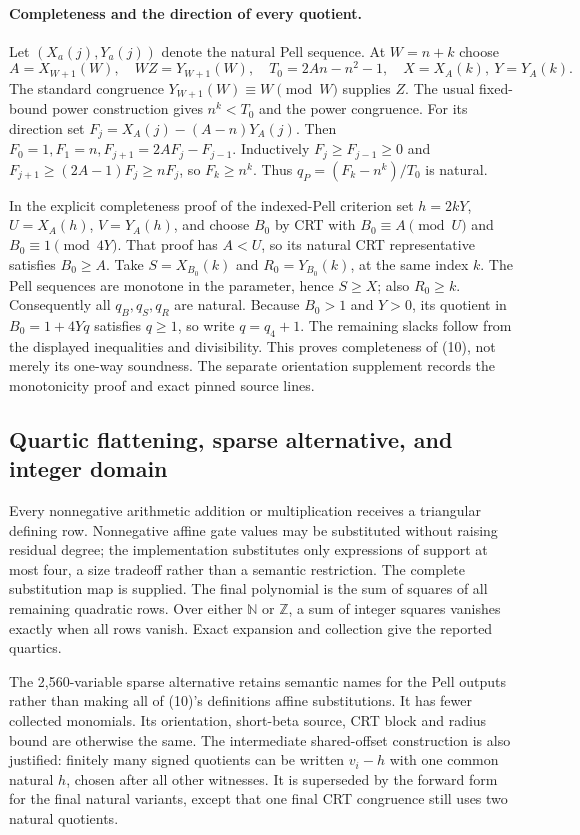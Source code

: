 \paragraph{Completeness and the direction of every quotient.}
Let $(X_a(j),Y_a(j))$ denote the natural Pell sequence.  At $W=n+k$ choose
\[
 A=X_{W+1}(W),\quad WZ=Y_{W+1}(W),\quad
 T_0=2An-n^2-1,\quad X=X_A(k),\ Y=Y_A(k).
\]
The standard congruence $Y_{W+1}(W)\equiv W\pmod W$ supplies $Z$.
The usual fixed-bound power construction gives $n^k<T_0$ and the power
congruence.  For its direction set
$F_j=X_A(j)-(A-n)Y_A(j)$.  Then
$F_0=1,F_1=n,F_{j+1}=2AF_j-F_{j-1}$.  Inductively
$F_j\ge F_{j-1}\ge0$ and
$F_{j+1}\ge(2A-1)F_j\ge nF_j$, so $F_k\ge n^k$.
Thus $q_P=(F_k-n^k)/T_0$ is natural.

In the explicit completeness proof of the indexed-Pell criterion set
$h=2kY$, $U=X_A(h)$, $V=Y_A(h)$, and choose $B_0$ by CRT with
$B_0\equiv A\pmod U$ and $B_0\equiv1\pmod{4Y}$.
That proof has $A<U$, so its natural CRT representative satisfies
$B_0\ge A$.  Take $S=X_{B_0}(k)$ and $R_0=Y_{B_0}(k)$, at the same
index $k$.  The Pell sequences are monotone in the parameter, hence
$S\ge X$; also $R_0\ge k$.  Consequently all $q_B,q_S,q_R$ are natural.
Because $B_0>1$ and $Y>0$, its quotient in $B_0=1+4Yq$ satisfies $q\ge1$,
so write $q=q_4+1$.  The remaining slacks follow from the displayed
inequalities and divisibility.  This proves completeness of (10), not
merely its one-way soundness.  The separate orientation supplement
records the monotonicity proof and exact pinned source lines.

\subsection{Quartic flattening, sparse alternative, and integer domain}

Every nonnegative arithmetic addition or multiplication receives a
triangular defining row.  Nonnegative affine gate values may be
substituted without raising residual degree; the implementation substitutes
only expressions of support at most four, a size tradeoff rather than a
semantic restriction.  The complete substitution map is supplied.
The final polynomial is the sum of squares of all remaining quadratic
rows.  Over either $\mathbb N$ or $\mathbb Z$, a sum of integer squares
vanishes exactly when all rows vanish.  Exact expansion and collection
give the reported quartics.

The 2,560-variable sparse alternative retains semantic names for the Pell
outputs rather than making all of (10)'s definitions affine substitutions.
It has fewer collected monomials.  Its orientation, short-beta source,
CRT block and radius bound are otherwise the same.  The intermediate
shared-offset construction is also justified: finitely many signed
quotients can be written $v_i-h$ with one common natural $h$, chosen after
all other witnesses.  It is superseded by the forward form for the final
natural variants, except that one final CRT congruence still uses two
natural quotients.

